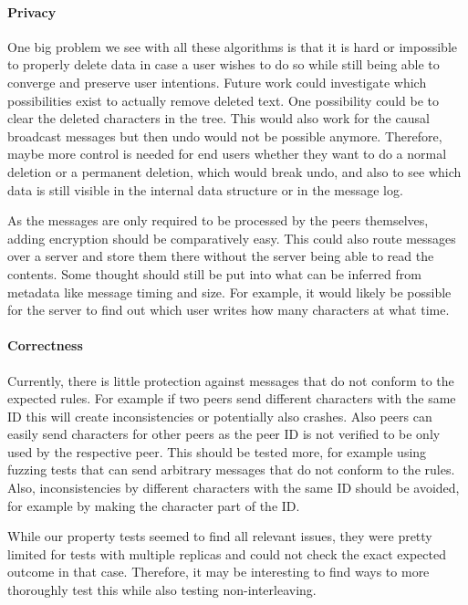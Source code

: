 \paragraph{Privacy} \label{sec:data-privacy-issues}

One big problem we see with all these algorithms is that it is hard or impossible to properly delete data in case a user wishes to do so while still being able to converge and preserve user intentions. Future work could investigate which possibilities exist to actually remove deleted text. One possibility could be to clear the deleted characters in the tree. This would also work for the causal broadcast messages but then undo would not be possible anymore. Therefore, maybe more control is needed for end users whether they want to do a normal deletion or a permanent deletion, which would break undo, and also to see which data is still visible in the internal data structure or in the message log.

As the messages are only required to be processed by the peers themselves, adding encryption should be comparatively easy. This could also route messages over a server and store them there without the server being able to read the contents. Some thought should still be put into what can be inferred from metadata like message timing and size. For example, it would likely be possible for the server to find out which user writes how many characters at what time.

\paragraph{Correctness} \label{section:future-work-correctness}

Currently, there is little protection against messages that do not conform to the expected rules. For example if two peers send different characters with the same ID this will create inconsistencies or potentially also crashes. Also peers can easily send characters for other peers as the peer ID is not verified to be only used by the respective peer. This should be tested more, for example using fuzzing tests that can send arbitrary messages that do not conform to the rules. Also, inconsistencies by different characters with the same ID should be avoided, for example by making the character part of the ID.

While our property tests seemed to find all relevant issues, they were pretty limited for tests with multiple replicas and could not check the exact expected outcome in that case. Therefore, it may be interesting to find ways to more thoroughly test this while also testing non-interleaving.


